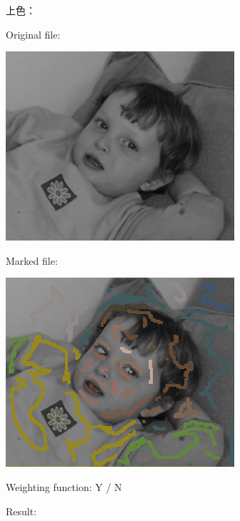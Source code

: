 \documentclass[12pt, a4paper, oneside]{report}
\begin{document}
	\noindent 上色：
	
	\noindent Original file: 
	
	\centerline{
	\includegraphics[scale=0.5]{baby.png}}
	
	\noindent Marked file:
	
	\centerline{
	\includegraphics[scale=0.5]{baby_marked.png}}
	 
	\noindent Weighting function: Y / N
	

	\noindent Result: 
	
\end{document}
